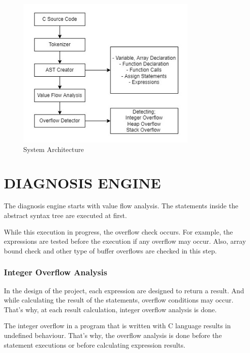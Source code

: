 \begin{figure}[!htbp]
    \centering
    \includegraphics[width=0.8\textwidth]{Imgs/Structure.jpg}
    \caption{\label{fig:SysArch}System Architecture}
\end{figure}

\section{DIAGNOSIS ENGINE}
The diagnosis engine starts with value flow analysis. The statements inside the abstract syntax tree are executed at first. 

While this execution in progress, the overflow check occurs. For example, the expressions are tested before the execution if any overflow may occur. Also, array bound check and other type of buffer overflows are checked in this step.
\subsubsection{Integer Overflow Analysis}
In the design of the project, each expression are designed to return a result. And while calculating the result of the statements, overflow conditions may occur. That's why, at each result calculation, integer overflow analysis is done. 

The integer overflow in a program that is written with C language results in undefined behaviour. That's why, the overflow analysis is done before the statement executions or before calculating expression results.

